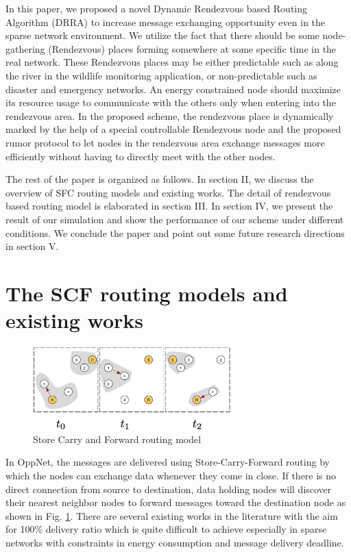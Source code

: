 \documentclass[conference]{IEEEtran}
\begin{document}
In this paper, we proposed a novel Dynamic Rendezvous based Routing Algorithm (DRRA) to increase message exchanging opportunity even in the sparse network environment.
We utilize the fact that there should be some node-gathering (Rendezvous) places forming somewhere at some specific time in the real network.
These Rendezvous places may be either predictable such as along the river in the wildlife monitoring application, or non-predictable such as disaster and emergency networks.
An energy constrained node should maximize its resource usage to communicate with the others only when entering into the rendezvous area.
In the proposed scheme, the rendezvous place is dynamically marked by the help of a special controllable Rendezvous node and the proposed rumor protocol to let nodes in the rendezvous area exchange messages more efficiently without having to directly meet with the other nodes.

The rest of the paper is organized as follows. 
In section II, we discuss the  overview of SFC routing models and existing works. 
The detail of rendezvous based routing model is elaborated in section III.
In section IV, we present the result of our simulation and show the performance of our scheme under different conditions.
We conclude the paper and point out some future research directions in section V.   

\section{The SCF routing models and existing works}

\begin{figure}[!t]
	\centering
	\includegraphics[width=3in]{Figures/SFC.pdf}
	\caption{Store Carry and Forward routing model}
	\label{SFC}
\end{figure}

In OppNet, the messages are delivered using Store-Carry-Forward routing by which  the nodes can exchange data whenever they come in close.
If there is no direct connection from source to destination, data holding nodes will discover their nearest neighbor nodes to forward messages toward the destination node as shown in Fig. \ref{SFC}.
There are several existing works in the literature \cite{Vahdat2000, Harras2005, Neena2013, Lindgren2003,Brendan2005,Boldrini2007,Kerdsri2013} with the aim for 100\% delivery ratio which is quite difficult to achieve especially in sparse networks with constraints in energy consumption and message delivery deadline.
\end{document}
